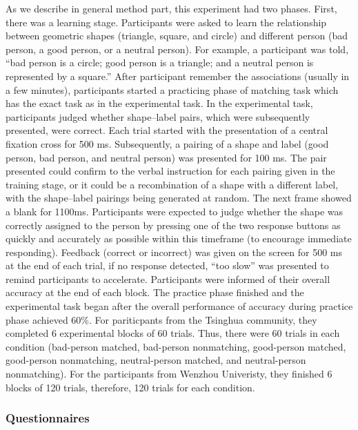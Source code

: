 \documentclass[man]{apa6}
\begin{document}
As we describe in general method part, this experiment had two phases. First, there was a learning stage. Participants were asked to learn the relationship between geometric shapes (triangle, square, and circle) and different person (bad person, a good person, or a neutral person). For example, a participant was told, \enquote{bad person is a circle; good person is a triangle; and a neutral person is represented by a square.} After participant remember the associations (usually in a few minutes), participants started a practicing phase of matching task which has the exact task as in the experimental task.
In the experimental task, participants judged whether shape--label pairs, which were subsequently presented, were correct. Each trial started with the presentation of a central fixation cross for 500 ms. Subsequently, a pairing of a shape and label (good person, bad person, and neutral person) was presented for 100 ms. The pair presented could confirm to the verbal instruction for each pairing given in the training stage, or it could be a recombination of a shape with a different label, with the shape--label pairings being generated at random. The next frame showed a blank for 1100ms. Participants were expected to judge whether the shape was correctly assigned to the person by pressing one of the two response buttons as quickly and accurately as possible within this timeframe (to encourage immediate responding). Feedback (correct or incorrect) was given on the screen for 500 ms at the end of each trial, if no response detected, \enquote{too slow} was presented to remind participants to accelerate. Participants were informed of their overall accuracy at the end of each block. The practice phase finished and the experimental task began after the overall performance of accuracy during practice phase achieved 60\%.
For pariticpants from the Tsinghua community, they completed 6 experimental blocks of 60 trials. Thus, there were 60 trials in each condition (bad-person matched, bad-person nonmatching, good-person matched, good-person nonmatching, neutral-person matched, and neutral-person nonmatching). For the participants from Wenzhou Univeristy, they finished 6 blocks of 120 trials, therefore, 120 trials for each condition.

\hypertarget{questionnaires}{%
\subsubsection{Questionnaires}\label{questionnaires}}
\end{document}
